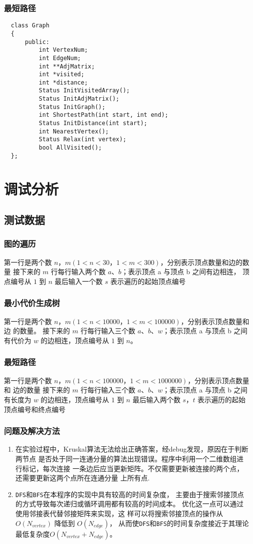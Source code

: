 \documentclass[UTF8]{ctexart}
\begin{document}
\subsubsection{最短路径}
\begin{lstlisting}
  class Graph
  {
      public:
          int VertexNum;
          int EdgeNum;
          int **AdjMatrix;
          int *visited;
          int *distance;
          Status InitVisitedArray();
          Status InitAdjMatrix();
          Status InitGraph();
          int ShortestPath(int start, int end);
          Status InitDistance(int start);
          int NearestVertex();
          Status Relax(int vertex);
          bool AllVisited();
  };
\end{lstlisting}

\section{调试分析}
\subsection{测试数据}
\subsubsection{图的遍历}
第一行是两个数 $n$，$m(1<n<30，1<m<300)$，分别表示顶点数量和边的数量
接下来的 $m$ 行每行输入两个数 $a$、$b$；表示顶点 a 与顶点 b 之间有边相连，
顶点编号从 $1$ 到 $n$
最后输入一个数 $s$ 表示遍历的起始顶点编号
\subsubsection{最小代价生成树}
第一行是两个数 $n$，$m(1<n<10000，1<m<100000)$，分别表示顶点数量和边
的数量。
接下来的 $m$ 行每行输入三个数 $a$、$b$、$w$；表示顶点 a 与顶点 b 之间有代价为
$w$ 的边相连，顶点编号从 $1$ 到 $n$。
\subsubsection{最短路径}
第一行是两个数 $n$，$m(1<n<100000，1<m<1000000)$，分别表示顶点数量和
边的数量
接下来的 $m$ 行每行输入三个数 $a$、$b$、$w$；表示顶点 a 与顶点 b 之间有长度为
$w$ 的边相连，顶点编号从 $1$ 到 $n$
最后输入两个数 $s$，$t$ 表示遍历的起始顶点编号和终点编号
\subsubsection{问题及解决方法}
\begin{enumerate}
\item 在实验过程中，Kruskal算法无法给出正确答案，经debug发现，原因在于判断两节点
是否处于同一连通分量的算法出现错误。程序中利用一个二维数组进行标记，每次连接
一条边后应当更新矩阵。不仅需要更新被连接的两个点，还需要更新这两个点所在连通分量
上所有点.
\item \lstinline{DFS}和\lstinline{BFS}在本程序的实现中具有较高的时间复杂度，
主要由于搜索邻接顶点的方式导致每次递归或循环调用都有较高的时间成本。
优化这一点可以通过使用邻接表代替邻接矩阵来实现，这
样可以将搜索邻接顶点的操作从 $O(N_{vertex})$ 降低到 $O(N_{edge})$，
从而使\lstinline{DFS}和\lstinline{BFS}的时间复杂度接近于其理论最低复杂度$O(N_{vertex} + N_{edge})$。
\end{enumerate}
\end{document}
